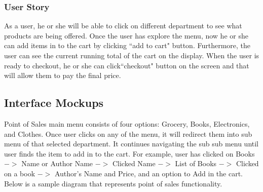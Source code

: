 \documentclass[10pt,conference,onecolumn,compsoc]{IEEEtran}
\begin{document}
\subsubsection*{User Story}
As a user, he or she will be able to click on different department to see what products are being offered. Once the user has explore the menu, now he or she can add items in to the cart by clicking ``add to cart" button. Furthermore, the user can see the current running total of the cart on the display. When the user is ready to checkout, he or she can click``checkout" button on the screen and that will allow them to pay the final price. 







\subsection{Interface Mockups}
Point of Sales main menu consists of four options: Grocery, Books, Electronics, and Clothes. Once user clicks on any of the menu, it will redirect them into sub menu of that selected department. It continues navigating the sub sub menu until user finds the item to add in to the cart. For example, user has clicked on Books $->$ Name or Author Name $->$ Clicked Name $->$ List of Books $->$ Clicked on a book $->$ Author's Name and Price, and an option to Add in the cart. \\
Below is a sample diagram that represents point of sales functionality. 
\end{document}
